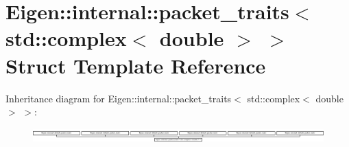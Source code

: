 \hypertarget{struct_eigen_1_1internal_1_1packet__traits_3_01std_1_1complex_3_01double_01_4_01_4}{}\section{Eigen\+:\+:internal\+:\+:packet\+\_\+traits$<$ std\+:\+:complex$<$ double $>$ $>$ Struct Template Reference}
\label{struct_eigen_1_1internal_1_1packet__traits_3_01std_1_1complex_3_01double_01_4_01_4}
Inheritance diagram for Eigen\+:\+:internal\+:\+:packet\+\_\+traits$<$ std\+:\+:complex$<$ double $>$ $>$\+:\begin{figure}[H]
\begin{center}
\leavevmode
\includegraphics[height=0.563948cm]{struct_eigen_1_1internal_1_1packet__traits_3_01std_1_1complex_3_01double_01_4_01_4}
\end{center}
\end{figure}
